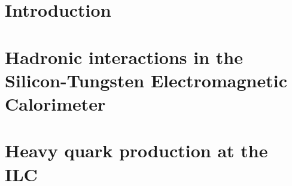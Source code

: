 \documentclass[a4paper, 12pt]{article}
\begin{document}
\linenumbers
\newpage\part{Introduction}\label{PARTI}

\newpage

\newpage

\newpage\part{Hadronic interactions in the Silicon-Tungsten Electromagnetic Calorimeter}\label{PARTII}

\newpage\part{Heavy quark production at the ILC}\label{PARTIII}

\newpage

\newpage

\newpage

\renewcommand\refname{References}



%
{}
%

% 
\end{document}
